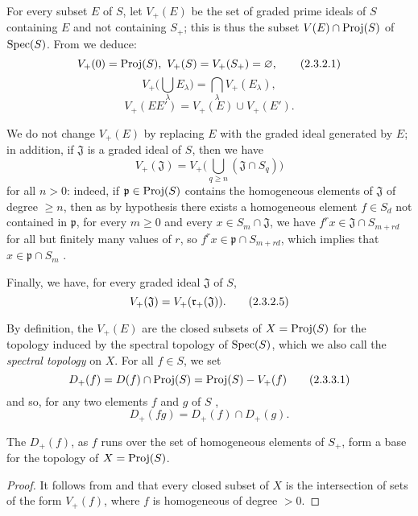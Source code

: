 \begin{env}[2.3.2]
\label{II.2.3.2}
For every subset $E$ of $S$, let $V_+(E)$ be the set of graded prime ideals of $S$ containing $E$ and not containing $S_+$;
this is thus the subset $V(E)\cap\operatorname{Proj}(S)$ of $\operatorname{Spec}(S)$.
From  we deduce:
\[
\label{II.2.3.2.1}
  V_+(0)=\operatorname{Proj}(S),\ V_+(S)=V_+(S_+)=\varnothing,
\tag{2.3.2.1}
\]
\[
\label{II.2.3.2.2}
  V_+\big(\textstyle\bigcup_\lambda E_\lambda\big)=\textstyle\bigcap_\lambda V_+(E_\lambda),
\tag{2.3.2.2}
\]
\[
\label{II.2.3.2.3}
  V_+(EE')=V_+(E)\cup V_+(E').
\tag{2.3.2.3}
\]

We do not change $V_+(E)$ by replacing $E$ with the graded ideal generated by $E$;
in addition, if $\mathfrak{J}$ is a graded ideal of $S$, then we have
\[
\label{II.2.3.2.4}
  V_+(\mathfrak{J})=V_+\big(\textstyle\bigcup_{q\geq n}(\mathfrak{J}\cap S_q)\big)
\tag{2.3.2.4}
\]
for all $n>0$: indeed, if $\mathfrak{p}\in\operatorname{Proj}(S)$ contains the homogeneous elements of $\mathfrak{J}$ of degree $\geq n$, then as by hypothesis there exists a homogeneous element $f\in S_d$ not contained in $\mathfrak{p}$, for every $m\geq 0$ and every $x\in S_m\cap\mathfrak{J}$, we have $f^r x\in\mathfrak{J}\cap S_{m+rd}$ for all but finitely many values of $r$, so $f^r x\in\mathfrak{p}\cap S_{m+rd}$, which implies that $x\in\mathfrak{p}\cap S_m$ .

Finally, we have, for every graded ideal $\mathfrak{J}$ of $S$,
\[
  V_+(\mathfrak{J})=V_+(\mathfrak{r}_+(\mathfrak{J})).
\tag{2.3.2.5}
\]
\end{env}

\begin{env}[2.3.3]
\label{II.2.3.3}
By definition, the $V_+(E)$ are the closed subsets of $X=\operatorname{Proj}(S)$ for the topology induced by the spectral topology of $\operatorname{Spec}(S)$, which we also call the \emph{spectral topology} on $X$.
For all $f\in S$, we set
\[
\label{II.2.3.3.1}
  D_+(f) = D(f)\cap\operatorname{Proj}(S) = \operatorname{Proj}(S)- V_+(f)
\tag{2.3.3.1}
\]
and so, for any two elements $f$ and $g$ of $S$ ,
\[
\label{II.2.3.3.2}
  D_+(fg) = D_+(f)\cap D_+(g).
\tag{2.3.3.2}
\]
\end{env}

\begin{proposition}[2.3.4]
\label{II.2.3.4}
The $D_+(f)$, as $f$ runs over the set of homogeneous elements of $S_+$, form a base for the topology of $X=\operatorname{Proj}(S)$.
\end{proposition}

\begin{proof}
It follows from  and  that every closed subset of $X$ is the intersection of sets of the form $V_+(f)$, where $f$ is homogeneous of degree $>0$.
\end{proof}

